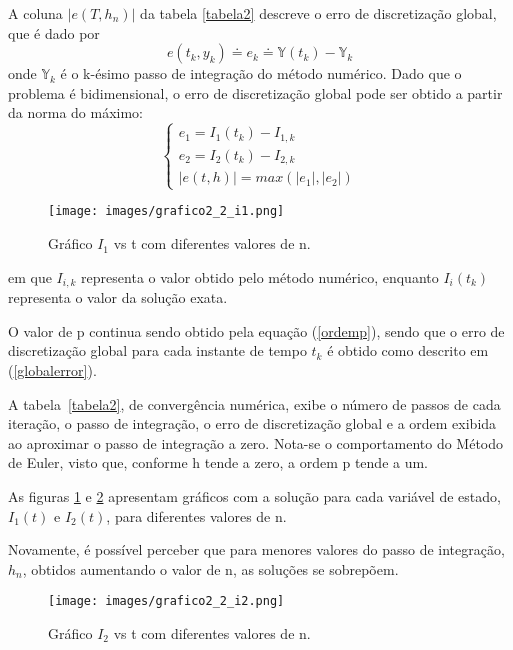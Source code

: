 \documentclass[12pt]{article}
\begin{document}
            A coluna \(|e(T,h_n)|\) da tabela \ref{tabela2} descreve o erro de discretização global, que é dado por
           \begin{equation}
           e(t_k, y_k) \doteq e_k \doteq \mathbb{Y}(t_k) - \mathbb{Y}_k 
           \end{equation}
    onde \(\mathbb{Y}_k\) é o k-ésimo passo de integração do método numérico. Dado que o problema é bidimensional, o erro de discretização global pode ser obtido a partir da norma do máximo:
    \begin{equation}
       \begin{cases}
        e_1 = I_1(t_k) - I_{1,k} \\
        e_2 = I_2(t_k) - I_{2,k}  \\
        |e(t, h)| = max(|e_1|, |e_2|)
        \end{cases}
        \label{globalerror}
    \end{equation}    
     \begin{figure}[h]
       \texttt{[image: images/grafico2\_2\_i1.png]}
       \caption{Gráfico \(I_1\) vs t com diferentes valores de n.}
       \label{grafico2.2i1}
    \end{figure} 
    \newpage
    em que \(I_{i,k}\) representa o valor obtido pelo método numérico, enquanto \(I_i(t_k)\) representa o valor da solução exata.
    
    
     O valor de p continua sendo obtido pela equação (\ref{ordemp}), sendo que o erro de discretização global para cada instante de tempo \(t_k\) é obtido como descrito em (\ref{globalerror}).
     
     A tabela~\ref{tabela2}, de convergência numérica, exibe o número de passos de cada iteração, o passo de integração, o erro de discretização global e a ordem exibida ao aproximar o passo de integração a zero. Nota-se o comportamento do Método de Euler, visto que, conforme h tende a zero, a ordem p tende a um.
   

     As figuras \ref{grafico2.2i1} e \ref{grafico2.2i2} apresentam gráficos com a solução para cada variável de estado, \(I_1(t)\) e \(I_2(t)\), para diferentes valores de n.

    Novamente, é possível perceber que para menores valores do passo de integração, \(h_n\), obtidos aumentando o valor de n, as soluções se sobrepõem.
    
     \begin{figure}
       \texttt{[image: images/grafico2\_2\_i2.png]}
       \caption{Gráfico \(I_2\) vs t com diferentes valores de n.}
       \label{grafico2.2i2}
    \end{figure}
\end{document}
